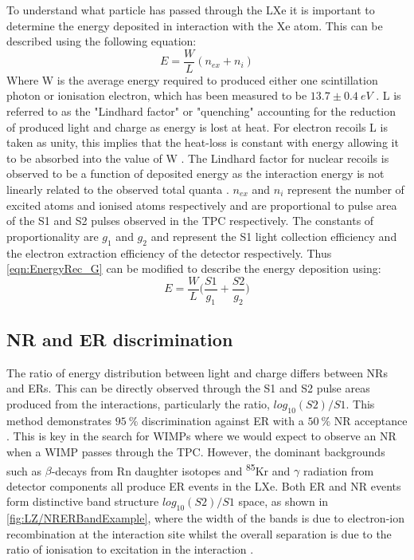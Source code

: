 To understand what particle has passed through the LXe it is important to determine the energy deposited in interaction with the Xe atom. This can be described using the following equation:
\begin{equation}
    E=\frac{W}{L}(n_{ex}+n_{i})
    \label{eqn:EnergyRec_noG}
\end{equation}
Where W is the average energy required to produced either one scintillation photon or ionisation electron, which has been measured to be $13.7\pm0.4~eV$ \cite{Goetzke:2016lfg, Dahl:2009nta}.
L is referred to as the "Lindhard factor" or "quenching" accounting for the reduction of produced light and charge as energy is lost at heat. For electron recoils L is taken as unity, this implies that the heat-loss is constant with energy allowing it to be absorbed into the value of W \cite{Rischbieter:2022}. The Lindhard factor for nuclear recoils is observed to be a function of deposited energy as the interaction energy is not linearly related to the observed total quanta \cite{Sorensen:2011bd}.
$n_{ex}$ and $n_{i}$ represent the number of excited atoms and ionised atoms respectively and are proportional to pulse area of the S1 and S2 pulses observed in the TPC respectively. The constants of proportionality are $g_1$ and $g_2$ and represent the S1 light collection efficiency and the electron extraction efficiency of the detector respectively. Thus \autoref{eqn:EnergyRec_G} can be modified to describe the energy deposition using:
\begin{equation}
    E=\frac{W}{L}\bigg(\frac{S1}{g_1}+\frac{S2}{g_2}\biggl)
    \label{eqn:EnergyRec_G}
\end{equation}

\subsection{NR and ER discrimination}\label{LZ/NRERDiscrim}
The ratio of energy distribution between light and charge differs between NRs and ERs. This can be directly observed through the S1 and S2 pulse areas produced from the interactions, particularly the ratio, $log_{10}(S2)/S1$. This method demonstrates $95~\%$ discrimination against ER with a $50~\%$ NR acceptance \cite{lzSens}. This is key in the search for WIMPs where we would expect to observe an NR when a WIMP passes through the TPC. However, the dominant backgrounds such as $\beta$-decays from Rn daughter isotopes and \textsuperscript{85}Kr and $\gamma$ radiation from detector components all produce ER events in the LXe. Both ER and NR events form distinctive band structure $log_{10}(S2)/S1$ space, as shown in \autoref{fig:LZ/NRERBandExample}, where the width of the bands is due to electron-ion recombination at the interaction site whilst the overall separation is due to the ratio of ionisation to excitation in the interaction \cite{Dahl:2009nta}.

